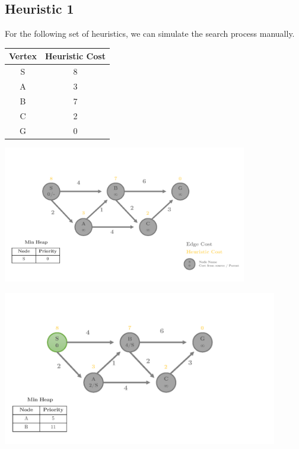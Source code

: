 \documentclass[12pt]{article}
\begin{document}

\subsection*{Heuristic 1}

For the following set of heuristics, we can simulate the search process manually.


\begin{table}[h]
  \centering
  \begin{tabular}{cc}
  \toprule
  \textbf{Vertex} & \textbf{Heuristic Cost} \\
  \midrule
  S & 8 \\
  A & 3 \\
  B & 7 \\
  C & 2 \\
  G & 0 \\
  \bottomrule
  \end{tabular}
\end{table}



\begin{center}
  \includegraphics[width=0.8\textwidth]{heuristic1_Page1.png}
\end{center}

\begin{center}
  \includegraphics[width=0.9\textwidth]{heuristic1_Page2.png}
\end{center}
\end{document}
